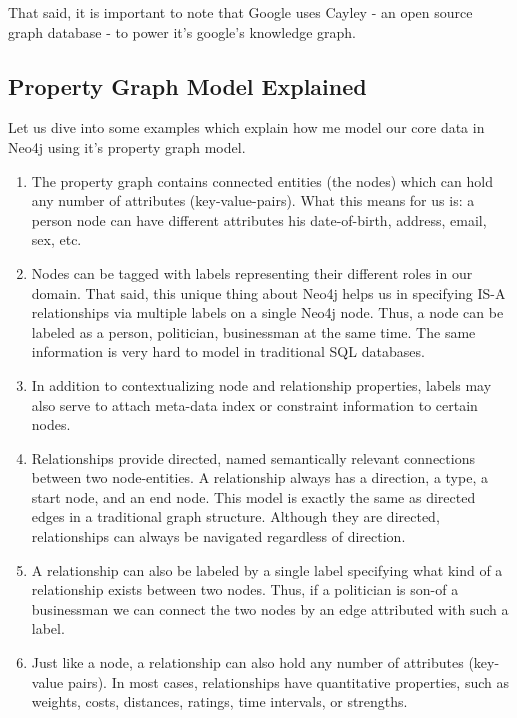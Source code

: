 That said, it is important to note that Google uses Cayley - an open source graph database -  to power it's google's knowledge graph.\cite{cayley} 


\subsection{Property Graph Model Explained}

Let us dive into some examples which explain how me model our core data in Neo4j using it's property graph model.\cite{neogdb}  \\

\begin{enumerate}

\item The property graph contains connected entities (the nodes) which can hold any number of attributes (key-value-pairs). What this means for us is: a person node can have different attributes his date-of-birth, address, email, sex, etc.

\item Nodes can be tagged with labels representing their different roles in our domain. That said, this unique thing about Neo4j helps us in specifying IS-A relationships via multiple labels on a single Neo4j node. Thus, a node can be labeled as a person, politician, businessman at the same time. The same information is very hard to model in traditional SQL databases.

\item In addition to contextualizing node and relationship properties, labels may also serve to attach meta-data index or constraint information to certain nodes.

\item Relationships provide directed, named semantically relevant connections between two node-entities. A relationship always has a direction, a type, a start node, and an end node. This model is exactly the same as directed edges in a traditional graph structure. Although they are directed, relationships can always be navigated regardless of direction.

\item A relationship can also be labeled by a single label specifying what kind of a relationship exists between two nodes. Thus, if a politician is son-of a businessman we can connect the two nodes by an edge attributed with such a label.

\item Just like a node, a relationship can also hold any number of attributes (key-value pairs). In most cases, relationships have quantitative properties, such as weights, costs, distances, ratings, time intervals, or strengths. 


\end{enumerate}
